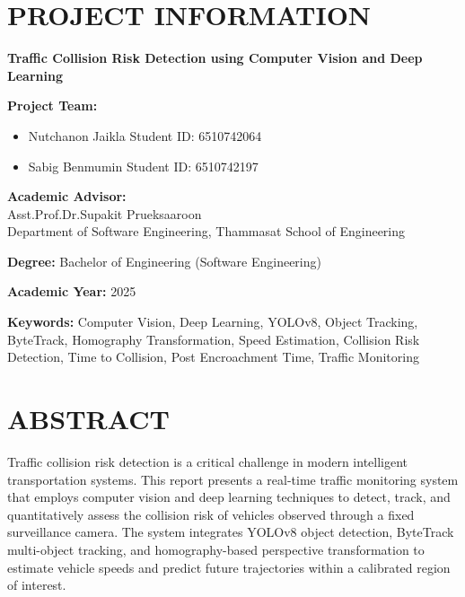 \documentclass[12pt]{report}
\begin{document}
\chapter*{PROJECT INFORMATION}

\begin{center}
    \bfseries
    Traffic Collision Risk Detection using Computer Vision and Deep Learning
\end{center}

\vspace{1em}
\noindent\textbf{Project Team:}
\begin{itemize}
    \item Nutchanon Jaikla \hfill Student ID: 6510742064
    \item Sabig Benmumin \hfill Student ID: 6510742197
\end{itemize}

\vspace{1em}
\noindent\textbf{Academic Advisor:}\\
Asst.Prof.Dr.Supakit Prueksaaroon\\
Department of Software Engineering, Thammasat School of Engineering

\vspace{1em}
\noindent\textbf{Degree:} Bachelor of Engineering (Software Engineering)

\vspace{1em}
\noindent\textbf{Academic Year:} 2025

\vspace{1em}
\noindent\textbf{Keywords:} Computer Vision, Deep Learning, YOLOv8, Object Tracking, ByteTrack, Homography Transformation, Speed Estimation, Collision Risk Detection, Time to Collision, Post Encroachment Time, Traffic Monitoring

\clearpage

\chapter*{ABSTRACT}

Traffic collision risk detection is a critical challenge in modern intelligent transportation systems.
This report presents a real-time traffic monitoring system that employs computer vision and deep learning techniques to detect, track, and quantitatively assess the collision risk of vehicles observed through a fixed surveillance camera.
The system integrates YOLOv8 object detection, ByteTrack multi-object tracking, and homography-based perspective transformation to estimate vehicle speeds and predict future trajectories within a calibrated region of interest.
\end{document}
